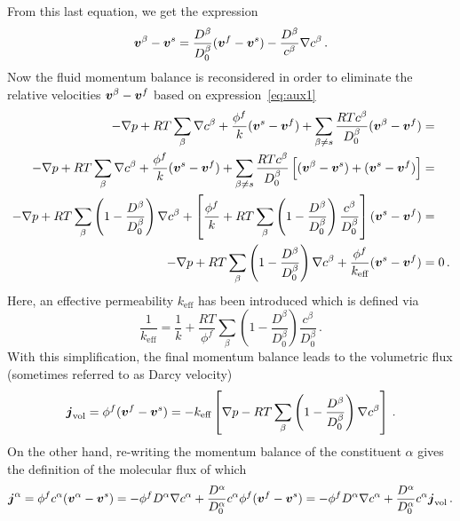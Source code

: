 \documentclass[a4paper,DIV=12,10pt]{scrartcl}
\newcommand{\V}[0]{\vek{v}}
\begin{document}
From this last equation, we get the expression
\begin{equation} \label{eq:aux1}
  \V^\beta - \V^s = \frac{D^\beta}{D^\beta_0} (\V^f - \V^s) -
  \frac{D^\beta}{c^\beta} \nabla c^\beta\,.
\end{equation}
Now the fluid momentum balance is reconsidered in order to eliminate the
relative velocities $\V^\beta - \V^f$ based on expression~\eqref{eq:aux1}
\begin{equation}
  \begin{aligned}
    - \nabla p + RT \sum_{\beta} \nabla c^\beta + \frac{\phi^f}{k} (\V^s - \V^f)
    + \sum_{\beta\neq s} \frac{RT c^\beta}{D_0^\beta} (\V^\beta - \V^f) & = \\  
    - \nabla p + RT \sum_{\beta} \nabla c^\beta + \frac{\phi^f}{k} (\V^s - \V^f)
    + \sum_{\beta\neq s} \frac{RT c^\beta}{D_0^\beta} 
    \left[(\V^\beta - \V^s) + (\V^s - \V^f) \right] &=  \\
    -\nabla p + RT \sum_{\beta} \left(1 - \frac{D^\beta}{D^\beta_0} \right)
    \nabla c^\beta +
    \left[ \frac{\phi^f}{k} + RT \sum_{\beta} 
      \left(1 - \frac{D^\beta}{D^\beta_0} \right) 
      \frac{c^\beta}{D^\beta_0} \right] (\V^s - \V^f) &= \\
    -\nabla p + RT \sum_{\beta} \left(1 - \frac{D^\beta}{D^\beta_0} \right)
    \nabla c^\beta +
    \frac{\phi^f}{k_{\text{eff}}} (\V^s - \V^f) &=0\,.
  \end{aligned}
\end{equation}
Here, an effective permeability $k_{\text{eff}}$ has been introduced which is
defined via
\begin{equation}
  \label{eq:effectivePermeability}
  \frac{1}{ k_{\text{eff}} } = \frac{1}{k} + \frac{RT}{\phi^f} 
  \sum_{\beta} \left(1 - \frac{D^\beta}{D^\beta_0} \right) \frac{c^\beta}{D^\beta_0} \,.
\end{equation}
With this simplification, the final momentum balance leads to the volumetric
flux (sometimes referred to as Darcy velocity) 
\begin{equation}
  \label{eq:volumetrixFlux}
  \vek{j}_{\text{vol}} = \phi^f (\V^f - \V^s) = - k_{\text{eff}} \left[ \nabla p - 
    RT \sum_{\beta} \left(1 - \frac{D^\beta}{D^\beta_0} \right)
    \nabla c^\beta \right]\,.
\end{equation}
On the other hand, re-writing the momentum balance of the constituent $\alpha$
gives the definition of the molecular flux of which
\begin{equation}
  \label{eq:molecularFlux}
  \vek{j}^\alpha = \phi^f c^\alpha (\V^\alpha - \V^s) 
  = - \phi^f D^\alpha \nabla c^\alpha 
  + \frac{D^\alpha}{D^\alpha_0} c^\alpha \phi^f ( \V^f - \V^s )
  = -\phi^f D^\alpha \nabla c^\alpha 
  + \frac{D^\alpha}{D^\alpha_0} c^\alpha \vek{j}_{\text{vol}}\,.
\end{equation}
\end{document}
